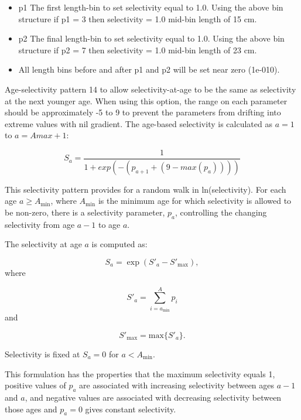\begin{itemize}
	\item p1 The first length-bin to set selectivity equal to 1.0. Using the above bin structure if p1 = 3 then selectivity = 1.0 mid-bin length of 15 cm.
	\item p2 The final length-bin to set selectivity equal to 1.0. Using the above bin structure if p2 = 7 then selectivity = 1.0 mid-bin length of 23 cm.
	\item All length bins before and after p1 and p2 will be set near zero (1e-010).
\end{itemize}

Age-selectivity pattern 14 to allow selectivity-at-age to be the same as selectivity at the next younger age. When using this option, the range on each parameter should be approximately -5 to 9 to prevent the parameters from drifting into extreme values with nil gradient. The age-based selectivity is calculated as $a = 1$ to $a = Amax + 1$:

\begin{equation}
	S_a = \frac{1}{1+exp(-(p_{a+1} + (9 - max(p_a))))}
\end{equation}	

This selectivity pattern provides for a random walk in ln(selectivity). For each age $a \geq A_{\text{min}}$, where $A_{\text{min}}$ is the minimum age for which selectivity is allowed to be non-zero, there is a selectivity parameter, $p_a$, controlling the changing selectivity from age $a-1$ to age $a$.
	
The selectivity at age $a$ is computed as:

	\begin{equation}
	S_a = \exp (S'_a - S'_{\text{max}}),
	\end{equation}
where

	\begin{equation}
	S'_a = \sum_{i = a_{\text{min}}}^A p_i
	\end{equation}
and
 
	\begin{equation}
	S'_{\text{max}} = \mbox{max} \{S'_a\}.
	\end{equation}

Selectivity is fixed at $S_a = 0$ for $a < A_{\text{min}}$. 
	
This formulation has the properties that the maximum selectivity equals 1, positive values of $p_a$ are associated with increasing selectivity between ages $a-1$ and $a$, and negative values are associated with decreasing selectivity between those ages and $p_a = 0$ gives constant selectivity.
	
